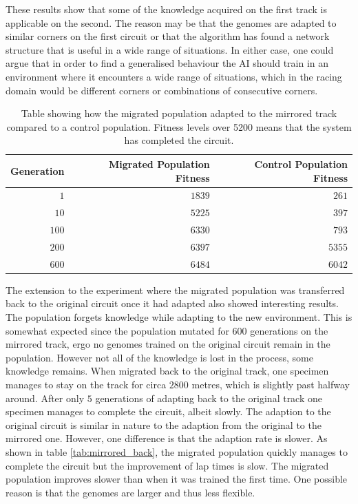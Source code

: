 \noindent
These results show that some of the knowledge acquired on the first track is applicable on the second. The reason may be that the genomes are adapted to similar corners on the first circuit or that the algorithm has found a network structure that is useful in a wide range of situations. In either case, one could argue that in order to find a generalised behaviour the AI should train in an environment where it encounters a wide range of situations, which in the racing domain would be different corners or combinations of consecutive corners. 

\begin{table}[H] 
  \centering
  \begin{tabular}{rrr}
    \toprule
    Generation & Migrated Population Fitness & Control Population Fitness\\
    \midrule
    $1$     & $1839$ & $261$    \\
    $10$    & $5225$ & $397$    \\
    $100$   & $6330$ & $793$    \\
    $200$   & $6397$ & $5355$   \\
    $600$   & $6484$ & $6042$   \\
    \bottomrule
  \end{tabular}
  \caption{Table showing how the migrated population adapted to the mirrored track compared to a control population. Fitness levels over 5200 means that the system has completed the circuit.}
  \label{tab:mirrored}
\end{table}

The extension to the experiment where the migrated population was transferred back to the original circuit once it had adapted also showed interesting results. The population forgets knowledge while adapting to the new environment. This is somewhat expected since the population mutated for 600 generations on the mirrored track, ergo no genomes trained on the original circuit remain in the population. However not all of the knowledge is lost in the process, some knowledge remains. When migrated back to the original track, one specimen manages to stay on the track for circa $2800$ metres, which is slightly past halfway around. After only $5$ generations of adapting back to the original track one specimen manages to complete the circuit, albeit slowly. The adaption to the original circuit is similar in nature to the adaption from the original to the mirrored one. However, one difference is that the adaption rate is slower. As shown in table \ref{tab:mirrored_back}, the migrated population quickly manages to complete the circuit but the improvement of lap times is slow. The migrated population improves slower than when it was trained the first time. One possible reason is that the genomes are larger and thus less flexible. 

